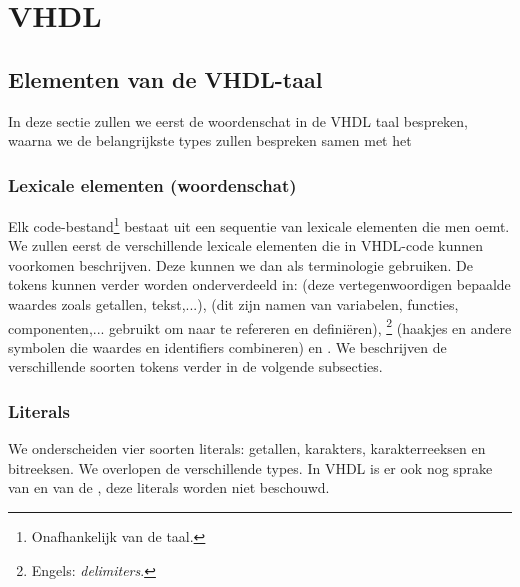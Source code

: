 \chapter{VHDL}
\section{Elementen van de VHDL-taal}
In deze sectie zullen we eerst de woordenschat in de VHDL taal bespreken, waarna we de belangrijkste types zullen bespreken samen met het 
\subsection{Lexicale elementen (woordenschat)}
Elk code-bestand\footnote{Onafhankelijk van de taal.} bestaat uit een sequentie van lexicale elementen die men  oemt. We zullen eerst de verschillende lexicale elementen die in VHDL-code kunnen voorkomen beschrijven. Deze kunnen we dan als terminologie gebruiken. De tokens kunnen verder worden onderverdeeld in:  (deze vertegenwoordigen bepaalde waardes zoals getallen, tekst,...),  (dit zijn namen van variabelen, functies, componenten,... gebruikt om naar te refereren en defini\"eren), \footnote{Engels: \emph{delimiters}.} (haakjes en andere symbolen die waardes en identifiers combineren) en . We beschrijven de verschillende soorten tokens verder in de volgende subsecties.

\subsection{Literals}
We onderscheiden vier soorten literals: getallen, karakters, karakterreeksen en bitreeksen. We overlopen de verschillende types. In VHDL is er ook nog sprake van  en van de , deze literals worden niet beschouwd.

